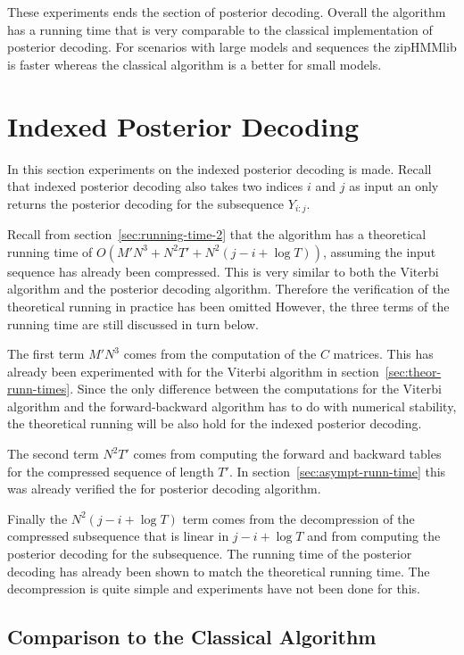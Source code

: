 These experiments ends the section of posterior decoding. Overall the algorithm
has a running time that is very comparable to the classical implementation of
posterior decoding. For scenarios with large models and sequences the zipHMMlib
is faster whereas the classical algorithm is a better for small models.

\section{Indexed Posterior Decoding}

In this section experiments on the indexed posterior decoding is
made. Recall that indexed posterior decoding also takes two indices $i$ and
$j$ as input an only returns the posterior decoding for the subsequence
$Y_{i:j}$.

Recall from section~\ref{sec:running-time-2} that the algorithm has a
theoretical running time of $O(M' N^3 + N^2 T' + N^2 (j - i + \log T))$,
assuming the input sequence has already been compressed. This is very similar
to both the Viterbi algorithm and the posterior decoding algorithm. Therefore
the verification of the theoretical running in practice has been omitted
However, the three terms of the running time are still discussed in turn below.

The first term $M' N^3$ comes from the computation of the $C$ matrices. This
has already been experimented with for the Viterbi algorithm in
section~\ref{sec:theor-runn-times}. Since the only difference between the
computations for the Viterbi algorithm and the forward-backward algorithm has
to do with numerical stability, the theoretical running will be also hold for
the indexed posterior decoding.

The second term $N^2 T'$ comes from computing the forward and backward tables
for the compressed sequence of length $T'$. In
section~\ref{sec:asympt-runn-time} this was already verified the for posterior
decoding algorithm.

Finally the $N^2 (j - i + \log T)$ term comes from the decompression of the
compressed subsequence that is linear in $j - i + \log T$ and from computing
the posterior decoding for the subsequence. The running time of the posterior
decoding has already been shown to match the theoretical running time. The
decompression is quite simple and experiments have not been done for
this. 

\subsection{Comparison to the Classical Algorithm}

